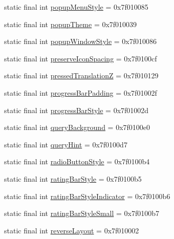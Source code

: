 \begin{CompactItemize}
static final int \hyperlink{classandroid_1_1support_1_1v7_1_1appcompat_1_1_r_1_1attr_9fa945362e4a2101255061a3958f519e}{popupMenuStyle} = 0x7f010085
\item 
static final int \hyperlink{classandroid_1_1support_1_1v7_1_1appcompat_1_1_r_1_1attr_2054dd0e6e8473bdb2c46b6bf341c3e9}{popupTheme} = 0x7f010039
\item 
static final int \hyperlink{classandroid_1_1support_1_1v7_1_1appcompat_1_1_r_1_1attr_9dcd0689639368e5d7b5f2c5ddb26921}{popupWindowStyle} = 0x7f010086
\item 
static final int \hyperlink{classandroid_1_1support_1_1v7_1_1appcompat_1_1_r_1_1attr_05c6b925634e11d4ba272d73a5dedb05}{preserveIconSpacing} = 0x7f0100cf
\item 
static final int \hyperlink{classandroid_1_1support_1_1v7_1_1appcompat_1_1_r_1_1attr_dc8d8bde2998a0d5370e5a89f33754f8}{pressedTranslationZ} = 0x7f010129
\item 
static final int \hyperlink{classandroid_1_1support_1_1v7_1_1appcompat_1_1_r_1_1attr_c39760cd6a812203a1ea1393c29f2c6c}{progressBarPadding} = 0x7f01002f
\item 
static final int \hyperlink{classandroid_1_1support_1_1v7_1_1appcompat_1_1_r_1_1attr_0272415e182e9343da48fa398b59f0db}{progressBarStyle} = 0x7f01002d
\item 
static final int \hyperlink{classandroid_1_1support_1_1v7_1_1appcompat_1_1_r_1_1attr_534f2a4d46ae28dcf3a55b295dfb927c}{queryBackground} = 0x7f0100e0
\item 
static final int \hyperlink{classandroid_1_1support_1_1v7_1_1appcompat_1_1_r_1_1attr_46dd1b7cc6544c3020f418699e76fe7d}{queryHint} = 0x7f0100d7
\item 
static final int \hyperlink{classandroid_1_1support_1_1v7_1_1appcompat_1_1_r_1_1attr_1b42cbb70f5dab8706e3e8eacb09d60f}{radioButtonStyle} = 0x7f0100b4
\item 
static final int \hyperlink{classandroid_1_1support_1_1v7_1_1appcompat_1_1_r_1_1attr_8f380cbb7f486eb6af57d87d9a0e6ee8}{ratingBarStyle} = 0x7f0100b5
\item 
static final int \hyperlink{classandroid_1_1support_1_1v7_1_1appcompat_1_1_r_1_1attr_e43e403eacf87c13aaab9dff5a36d1ac}{ratingBarStyleIndicator} = 0x7f0100b6
\item 
static final int \hyperlink{classandroid_1_1support_1_1v7_1_1appcompat_1_1_r_1_1attr_b25df3c67d39ae1c9d5ed432bca3548d}{ratingBarStyleSmall} = 0x7f0100b7
\item 
static final int \hyperlink{classandroid_1_1support_1_1v7_1_1appcompat_1_1_r_1_1attr_29482e373e53479124ff8680f34f6a13}{reverseLayout} = 0x7f010002

\end{CompactItemize}
